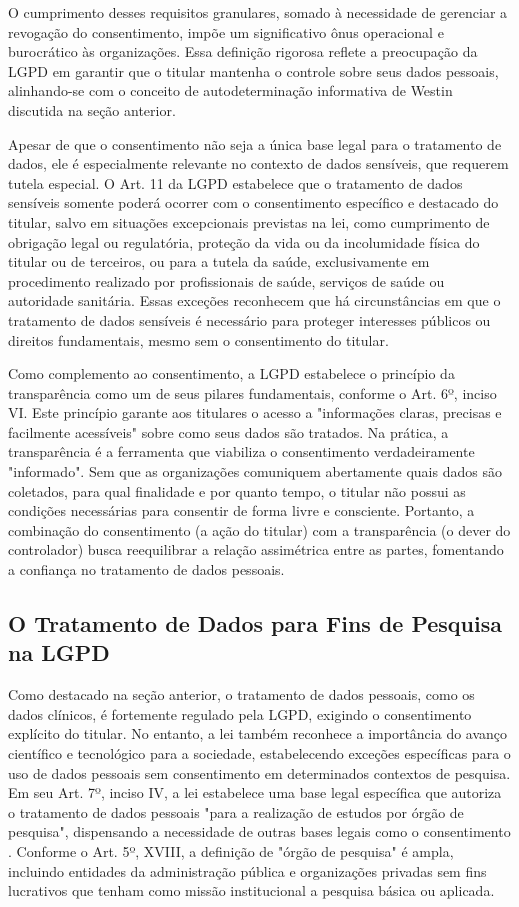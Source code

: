 O cumprimento desses requisitos granulares, somado à necessidade de gerenciar a revogação do consentimento, impõe um significativo ônus operacional e burocrático às organizações. Essa definição rigorosa reflete a preocupação da LGPD em garantir que o titular mantenha o controle sobre seus dados pessoais, alinhando-se com o conceito de autodeterminação informativa de Westin discutida na seção anterior.

Apesar de que o consentimento não seja a única base legal para o tratamento de dados, ele é especialmente relevante no contexto de dados sensíveis, que requerem tutela especial. O Art. 11 da LGPD estabelece que o tratamento de dados sensíveis somente poderá ocorrer com o consentimento específico e destacado do titular, salvo em situações excepcionais previstas na lei, como cumprimento de obrigação legal ou regulatória, proteção da vida ou da incolumidade física do titular ou de terceiros, ou para a tutela da saúde, exclusivamente em procedimento realizado por profissionais de saúde, serviços de saúde ou autoridade sanitária.
Essas exceções reconhecem que há circunstâncias em que o tratamento de dados sensíveis é necessário para proteger interesses públicos ou direitos fundamentais, mesmo sem o consentimento do titular.

Como complemento ao consentimento, a LGPD estabelece o princípio da transparência como um de seus pilares fundamentais, conforme o Art. 6º, inciso VI. Este princípio garante aos titulares o acesso a "informações claras, precisas e facilmente acessíveis" sobre como seus dados são tratados. Na prática, a transparência é a ferramenta que viabiliza o consentimento verdadeiramente "informado". Sem que as organizações comuniquem abertamente quais dados são coletados, para qual finalidade e por quanto tempo, o titular não possui as condições necessárias para consentir de forma livre e consciente. Portanto, a combinação do consentimento (a ação do titular) com a transparência (o dever do controlador) busca reequilibrar a relação assimétrica entre as partes, fomentando a confiança no tratamento de dados pessoais.

\subsection{O Tratamento de Dados para Fins de Pesquisa na LGPD}
\label{subsec:fund-pesquisa-lgpd}

Como destacado na seção anterior, o tratamento de dados pessoais, como os dados clínicos, é fortemente regulado pela LGPD, exigindo o consentimento explícito do titular. No entanto, a lei também reconhece a importância do avanço científico e tecnológico para a sociedade, estabelecendo exceções específicas para o uso de dados pessoais sem consentimento em determinados contextos de pesquisa. Em seu Art. 7º, inciso IV, a lei estabelece uma base legal específica que autoriza o tratamento de dados pessoais "para a realização de estudos por órgão de pesquisa", dispensando a necessidade de outras bases legais como o consentimento \cite{Brasil2018lgpd}. Conforme o Art. 5º, XVIII, a definição de "órgão de pesquisa" é ampla, incluindo entidades da administração pública e organizações privadas sem fins lucrativos que tenham como missão institucional a pesquisa básica ou aplicada.

